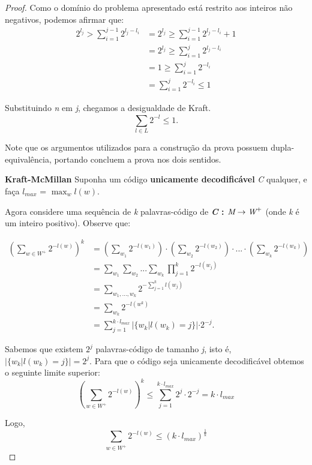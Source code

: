 \begin{lemma}
\begin{proof}
Como o domínio do problema apresentado está restrito aos inteiros não negativos, podemos afirmar que:
\begin{align*}
2^{l_j} > \sum_{i=1}^{j-1} 2^{l_j - l_i} &= 2^{l_j} \geq \sum_{i=1}^{j-1} 2^{l_j - l_i} + 1 \\
&= 2^{l_j} \geq \sum_{i=1}^{j} 2^{l_j - l_i} \\
&= 1 \geq \sum_{i=1}^{j} 2^{-l_i} \\
&=  \sum_{i=1}^{j} 2^{-l_i} \leq 1
\end{align*}

Substituindo \emph{n} em \emph{j}, chegamos a desigualdade de Kraft.
\begin{equation*}
\sum_{l \in L}^{} 2^{-l} \leq 1.
\end{equation*}

Note que os argumentos utilizados para a construção da prova possuem dupla-equivalência, portando concluem a prova nos dois sentidos.

\item \textbf{Kraft-McMillan}
Suponha um código \textbf{unicamente decodificável} \emph{C} qualquer, e faça $l_{max}$ = $\max_{w}l(w)$.

Agora considere uma sequência de \emph{k} palavras-código de \textbf{\emph{C} : $\emph{M} \rightarrow \emph{W}^+$} (onde \emph{k} é um inteiro positivo). Observe que:

\begin{align*}
(\sum_{w \in W^+}^{}2^{-l(w)})^k &= (\sum_{w_1}^{}2^{-l(w_1)}) \cdot (\sum_{w_2}^{}2^{-l(w_2)}) \cdot ... \cdot (\sum_{w_k}^{}2^{-l(w_k)}) \\
&= \sum_{w_1}^{} \sum_{w_2}^{} ... \sum_{w_k}^{} \prod_{j = 1}^{k} 2^{-l(w_j)} \\
&= \sum_{w_1,..., w_k}^{} 2^{- \sum_{j=1}^{k} l(w_j)} \\
&= \sum_{w_k}^{} 2^{-l(w^k)} \\
&= \sum_{j=1}^{k \cdot l_{max}} |\{w_k | l(w_k) = j\}| \cdot 2^{-j}.
\end{align*}

Sabemos que existem $2^{j}$ palavras-código de tamanho \emph{j}, isto é, $|\{w_k | l(w_k) = j\}| = 2^j$. Para que o código seja unicamente decodificável obtemos o seguinte limite superior:
\begin{equation*}
(\sum_{w \in W^+}^{}2^{-l(w)})^k \leq \sum_{j=1}^{k \cdot l_{max}} 2^j \cdot 2^{-j} = k \cdot l_{max}
\end{equation*}

Logo,
\begin{equation*}
\sum_{w \in W^+}^{}2^{-l(w)} \leq (k \cdot l_{max})^ \frac{1}{k}
\end{equation*}


\end{proof}
\end{lemma}

